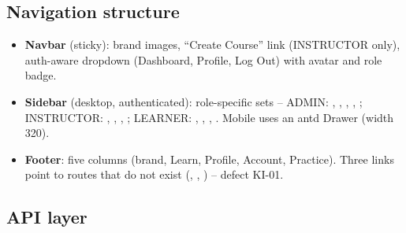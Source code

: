 \subsection{Navigation structure}

\begin{itemize}
    \item \textbf{Navbar} (sticky): brand images, ``Create Course'' link (INSTRUCTOR only), auth-aware dropdown (Dashboard, Profile, Log Out) with avatar and role badge.
    \item \textbf{Sidebar} (desktop, authenticated): role-specific  sets -- ADMIN: , , , , ; INSTRUCTOR: , , , ; LEARNER: , , , . Mobile uses an antd Drawer (width 320).
    \item \textbf{Footer}: five columns (brand, Learn, Profile, Account, Practice). Three links point to routes that do not exist (, , ) -- defect KI-01.
\end{itemize}

\subsection{API layer}

